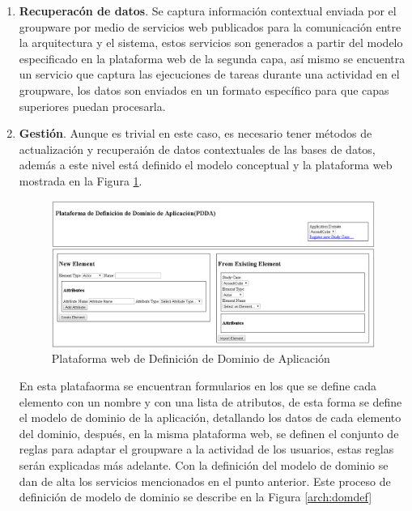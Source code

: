 \begin{enumerate}


\item \textbf{Recuperac\'on de datos}. Se captura informaci\'on contextual enviada por el groupware por medio de servicios web publicados para la comunicaci\'on entre la arquitectura y el sistema, estos servicios son generados a partir del modelo especificado en la plataforma web de la segunda capa, as\'i mismo se encuentra un servicio que captura las ejecuciones de tareas durante una actividad en el groupware, los datos son enviados en un formato espec\'ifico para que capas superiores puedan procesarla.

\item \textbf{Gesti\'on}. Aunque es trivial en este caso, es necesario tener m\'etodos de actualizaci\'on y recuperai\'on de datos contextuales de las bases de datos, adem\'as a este nivel est\'a definido el modelo conceptual y la plataforma web mostrada en la Figura \ref{arch:wplatform}.

\newpage
\begin{figure}[h!]
\centering
\includegraphics[scale=0.50]{images/attDef}
\caption{Plataforma web de Definici\'on de Dominio de Aplicaci\'on}
\label{arch:wplatform}
\end{figure}

En esta platafaorma se encuentran formularios en los que se define cada elemento con un nombre y con una lista de atributos, de esta forma se define el modelo de dominio de la aplicaci\'on, detallando los datos de cada elemento del dominio, despu\'es, en la misma plataforma web, se definen el conjunto de reglas para adaptar el groupware a la actividad de los usuarios, estas reglas ser\'an explicadas m\'as adelante. Con la definici\'on del modelo de dominio se dan de alta los servicios mencionados en el punto anterior. Este proceso de definici\'on de modelo de dominio se describe en la Figura \ref{arch:domdef}


\end{enumerate}
